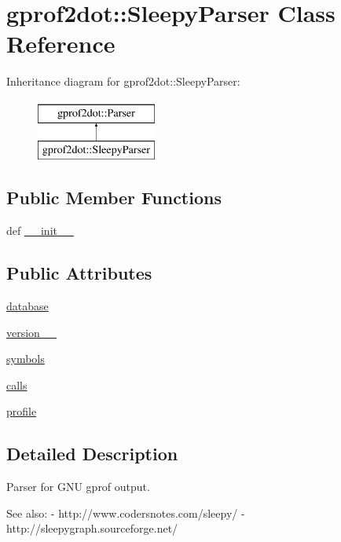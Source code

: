 \hypertarget{classgprof2dot_1_1SleepyParser}{
\section{gprof2dot::SleepyParser Class Reference}
\label{classgprof2dot_1_1SleepyParser}
}
Inheritance diagram for gprof2dot::SleepyParser:\begin{figure}[H]
\begin{center}
\leavevmode
\includegraphics[height=2.000000cm]{classgprof2dot_1_1SleepyParser}
\end{center}
\end{figure}
\subsection*{Public Member Functions}
\begin{DoxyCompactItemize}
\item 
def \hyperlink{classgprof2dot_1_1SleepyParser_a8860ca8cc12c69c9b0646bb6fce19a48}{\_\-\_\-init\_\-\_\-}
\end{DoxyCompactItemize}
\subsection*{Public Attributes}
\begin{DoxyCompactItemize}
\item 
\hyperlink{classgprof2dot_1_1SleepyParser_aa4c6155496d6d6d966a97ac88bf37bbc}{database}
\item 
\hyperlink{classgprof2dot_1_1SleepyParser_a87af513951ab6c964913252846779c3c}{version\_\_}
\item 
\hyperlink{classgprof2dot_1_1SleepyParser_aa02364faa47a8b792bf2cfe6331b635d}{symbols}
\item 
\hyperlink{classgprof2dot_1_1SleepyParser_a3ea54178cb05f4bb06f138034d1a2ff3}{calls}
\item 
\hyperlink{classgprof2dot_1_1SleepyParser_a8b6a82e997115811f4d099fd494265ae}{profile}
\end{DoxyCompactItemize}


\subsection{Detailed Description}
\begin{DoxyVerb}Parser for GNU gprof output.

See also:
- http://www.codersnotes.com/sleepy/
- http://sleepygraph.sourceforge.net/
\end{DoxyVerb}
 

